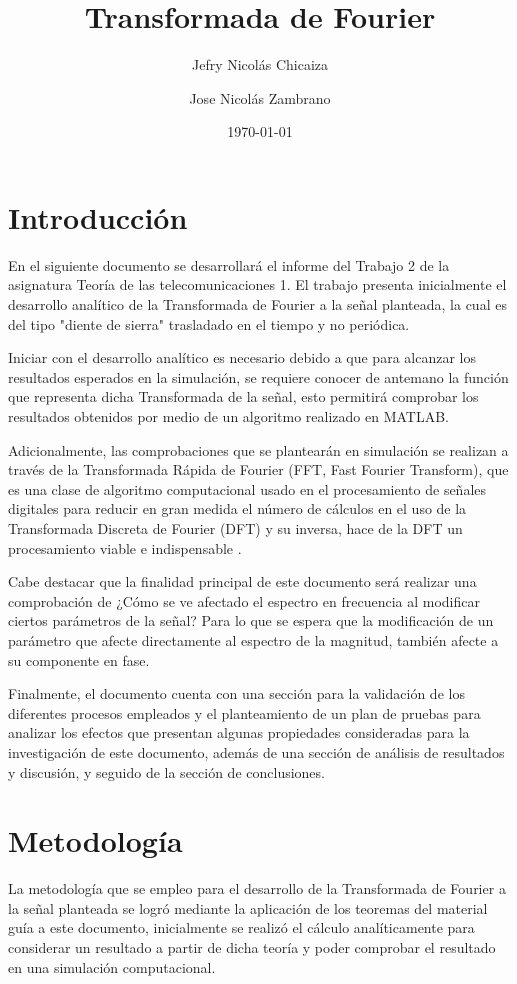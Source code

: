 \documentclass[11pt,letterpaper,twocolumn]{article}
\date{\today}
\title{
    \fontsize{26}{26}\selectfont 
    \textbf{Transformada de Fourier
    \vspace{-5mm}}}
\author[1]{Jefry Nicolás Chicaiza}
\author[2]{Jose Nicolás Zambrano}
\affil[1]{\url{jefryn@unicauca.edu.co}
    \vspace{-2mm}}
\affil[2]{\url{jnzambranob@unicauca.edu.co}
    \vspace{-5mm}}
\date{}
\begin{document}
\maketitle
\vspace{-5mm}
\thispagestyle{fancy}
\section{Introducción}\label{intro}
    En el siguiente documento se desarrollará el informe del Trabajo 2 de la asignatura 
    Teoría de las telecomunicaciones 1. El trabajo presenta inicialmente el desarrollo 
    analítico de la Transformada de Fourier a la señal planteada, la cual es del tipo 
    "diente de sierra"  trasladado en el tiempo y no periódica.
    
    Iniciar con el desarrollo analítico es necesario debido a que para alcanzar los 
    resultados esperados en la simulación, se requiere conocer de antemano la función que 
    representa dicha Transformada de la señal, esto permitirá comprobar los resultados 
    obtenidos por medio de un algoritmo realizado en MATLAB.
    
    Adicionalmente, las comprobaciones que se plantearán en simulación se realizan a través 
    de la Transformada Rápida de Fourier (FFT, Fast Fourier Transform), que es una clase de 
    algoritmo computacional usado en el procesamiento de señales digitales para reducir en gran 
    medida el número de cálculos en el uso de la Transformada Discreta de Fourier (DFT) y su 
    inversa, hace de la DFT un procesamiento viable e indispensable \cite{Poularikas2007}.
    
    Cabe destacar que la finalidad principal de este documento será realizar una comprobación de 
    ¿Cómo se ve afectado el espectro en frecuencia al modificar ciertos parámetros de la señal?
    Para lo que se espera que la modificación de un parámetro que afecte directamente al espectro 
    de la magnitud, también afecte a su componente en fase.
    
    Finalmente, el documento cuenta con una sección para la validación de los diferentes procesos
    empleados y el planteamiento de un plan de pruebas para analizar los efectos que presentan
    algunas propiedades consideradas para la investigación de este documento, además de una sección
    de análisis de resultados y discusión, y seguido de la sección de conclusiones.
       
\section{Metodología}
    La metodología que se empleo para el desarrollo de la Transformada de Fourier a la señal planteada 
    se logró mediante la aplicación de los teoremas del material guía a este documento, inicialmente
    se realizó el cálculo analíticamente para considerar un resultado a partir de dicha teoría y
    poder comprobar el resultado en una simulación computacional. 
    
\end{document}
